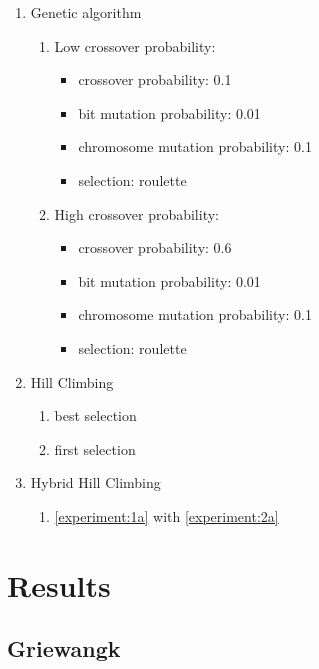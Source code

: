\documentclass{article}
\begin{document}
\begin{enumerate} 
	\item Genetic algorithm
	\begin{enumerate}
		\item \label{experiment:1a} Low crossover probability: 
		\begin{itemize}
			\item crossover probability: 0.1
			\item bit mutation probability: 0.01
			\item chromosome mutation probability: 0.1
			\item selection: roulette
		\end{itemize} 
		\item \label{experiment:1b} High crossover probability:
		\begin{itemize}
			\item crossover probability: 0.6
			\item bit mutation probability: 0.01
			\item chromosome mutation probability: 0.1
			\item selection: roulette
		\end{itemize}
	\end{enumerate} 

	\item Hill Climbing
	\begin{enumerate}
		\item \label{experiment:2a} best selection
		\item \label{experiment:2b} first selection
	\end{enumerate}

	\item Hybrid Hill Climbing
	\begin{enumerate}
		\item \label{experiment:3a} \ref{experiment:1a} with \ref{experiment:2a}
	\end{enumerate}
  
\end{enumerate}

\section{Results}

\subsection{Griewangk}
\end{document}
